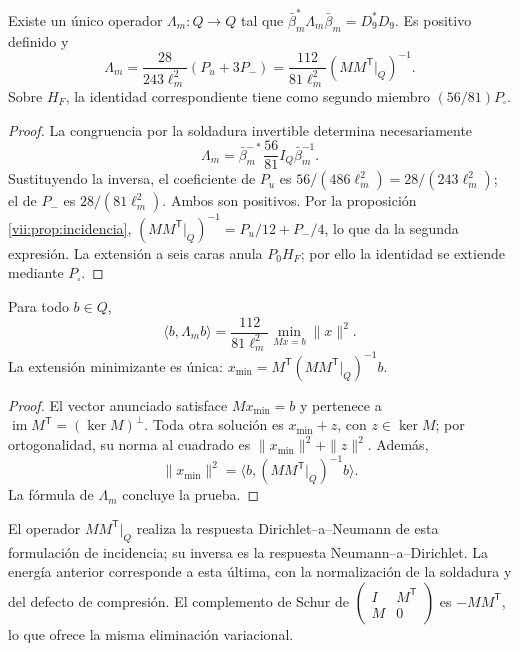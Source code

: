 \begin{theorem}
\label{vii:thm:respuesta-unica}
Existe un único operador \(\Lambda_m:Q\longrightarrow Q\) tal que
\(\bar\beta_m^*\Lambda_m\bar\beta_m=D_9^*D_9\). Es positivo definido y
\begin{equation}
 \Lambda_m=\frac{28}{243\ell_m^2}(P_u+3P_-)
 =\frac{112}{81\ell_m^2}
       (MM^{\mathsf T}|_Q)^{-1}.
 \label{vii:eq:lambda-pantalla}
\end{equation}
Sobre \(H_F\), la identidad correspondiente tiene como segundo miembro
\((56/81)P_\square\).
\end{theorem}

\begin{proof}
La congruencia por la soldadura invertible determina necesariamente
\[
 \Lambda_m=\bar\beta_m^{-*}\frac{56}{81}I_Q\bar\beta_m^{-1}.
\]
Sustituyendo la inversa, el coeficiente de \(P_u\) es
\(56/(486\ell_m^2)=28/(243\ell_m^2)\); el de \(P_-\) es
\(28/(81\ell_m^2)\). Ambos son positivos. Por la
proposición \ref{vii:prop:incidencia},
\((MM^{\mathsf T}|_Q)^{-1}=P_u/12+P_-/4\),
lo que da la segunda expresión. La extensión a seis caras anula
\(P_0H_F\); por ello la identidad se extiende mediante \(P_\square\).
\end{proof}

\begin{proposition}
\label{vii:prop:minima-extension}
Para todo \(b\in Q\),
\[
 \langle b,\Lambda_m b\rangle
 =\frac{112}{81\ell_m^2}
   \min_{Mx=b}\|x\|^2.
\]
La extensión minimizante es única:
\(x_{\min}=M^{\mathsf T}(MM^{\mathsf T}|_Q)^{-1}b\).
\end{proposition}

\begin{proof}
El vector anunciado satisface \(Mx_{\min}=b\) y pertenece a
\(\operatorname{im}M^{\mathsf T}=(\ker M)^\perp\).
Toda otra solución es \(x_{\min}+z\), con \(z\in\ker M\); por
ortogonalidad, su norma al cuadrado es \(\|x_{\min}\|^2+\|z\|^2\).
Además,
\[
 \|x_{\min}\|^2
 =\langle b,(MM^{\mathsf T}|_Q)^{-1}b\rangle.
\]
La fórmula de \(\Lambda_m\) concluye la prueba.
\end{proof}

El operador \(MM^{\mathsf T}|_Q\) realiza la respuesta
Dirichlet--a--Neumann de esta formulación de incidencia; su inversa
es la respuesta Neumann--a--Dirichlet. La energía anterior corresponde
a esta última, con la normalización de la soldadura y del defecto de
compresión. El complemento de Schur de
\(\left(\begin{smallmatrix}I&M^{\mathsf T}\\M&0\end{smallmatrix}\right)\)
es \(-MM^{\mathsf T}\), lo que ofrece la misma eliminación variacional.

